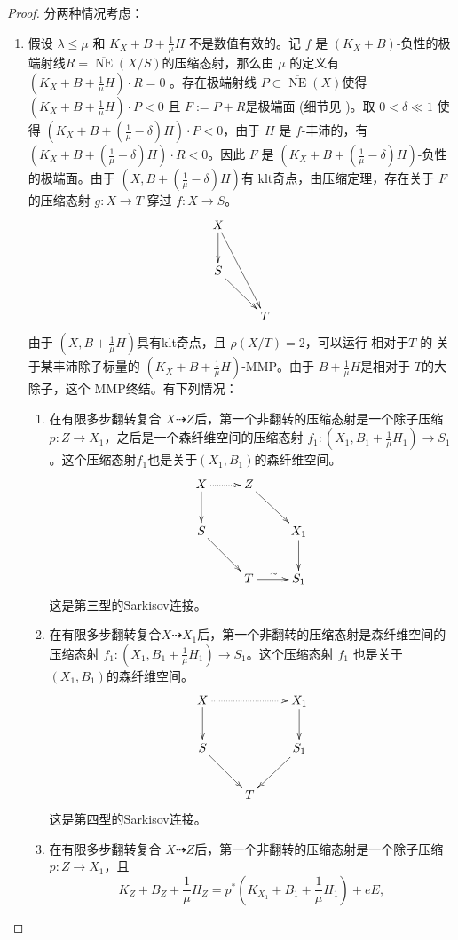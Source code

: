 \begin{proof}
  分两种情况考虑：
  \begin{enumerate}
    \item 假设 $\lambda\leqslant \mu$ 和  $ K_X+B+\frac{1}{\mu}H $ 不是数值有效的。记 $ f $ 是 $ (K_X+B) $-负性的极端射线$ R= \overline{\operatorname{ NE }}(X/S) $的压缩态射，那么由 $\mu$ 的定义有$ (K_X+B+\frac{1}{\mu}H)\cdot R=0 $ 。存在极端射线 $ P \subset \overline{\operatorname{ NE }}(X) $使得$ (K_X+B+\frac{1}{\mu}H)\cdot P<0 $ 且 $ F:=P+R $是极端面  (细节见 \cite [5.4.2]{cortiFactoringBirationalMaps} )。取  $ 0<\delta\ll 1 $ 使得 $ (K_X+B+(\frac{1}{\mu}-\delta)H)\cdot P<0 $，由于  $H$ 是 $f$-丰沛的，有 $  (K_X+B+(\frac{1}{\mu}-\delta)H)\cdot R<0 $。因此 $ F $ 是 $  (K_X+B+(\frac{1}{\mu}-\delta)H) $-负性的极端面。由于 $ (X,B+(\frac{1}{\mu}-\delta)H) $有 klt奇点，由压缩定理，存在关于 $F$ 的压缩态射 $ g:X\to T $  穿过 $ f:X\to S $。
  \[ \xymatrix{
      X\ar[d]\ar[rdd]& \\
      S\ar[rd]&\\
         &T } \]
      由于  $ (X,B+\frac{1}{\mu}H) $具有klt奇点，且 $ \rho(X/T)=2 $，可以运行 相对于$T$ 的 关于某丰沛除子标量的 $ (K_X+B+\frac{1}{\mu}H) $-MMP。由于 $ B+\frac{1}{\mu}H $是相对于 $T$的大除子，这个 MMP终结。有下列情况：
    \begin{enumerate}
      \item 在有限多步翻转复合 $ X\dashrightarrow Z $后，第一个非翻转的压缩态射是一个除子压缩 $ p:Z\to X_1 $，之后是一个森纤维空间的压缩态射 $f_{1}:(X_{1},B_{1}+\frac{1}{\mu}H_{1})\to S_1$。这个压缩态射$f_1$也是关于$(X_{1},B_{1})$的森纤维空间。
      \[ \xymatrix{
          X\ar@{.>}[r]\ar[d]& Z\ar[rd] \\
          S\ar[rd]& & X_{1}\ar[d]\\
               &T\ar[r]^{\sim}& S_{1} } \]
      这是第三型的Sarkisov连接。
      \item 在有限多步翻转复合$ X\dashrightarrow X_1 $后，第一个非翻转的压缩态射是森纤维空间的压缩态射 $ f_1:(X_1,B_1+\frac{1}{\mu}H_1)\to S_{1} $。这个压缩态射 $f_1$ 也是关于 $(X_{1},B_{1})$的森纤维空间。
      \[ \xymatrix{
          X\ar@{.>}[rr]\ar[d]& &X_{1}\ar[d] \\
          S\ar[rd]& & S_{1}\ar[ld]\\
             &T& } \]
        这是第四型的Sarkisov连接。
      \item 在有限多步翻转复合 $ X\dashrightarrow Z $后，第一个非翻转的压缩态射是一个除子压缩 $ p:Z\to X_1 $，且
            \[ K_Z+B_Z+\frac{1}{\mu}H_Z=p^*(K_{X_1}+B_1+\frac{1}{\mu}H_1)+eE ,\]

\end{enumerate}
\end{enumerate}
\end{proof}
